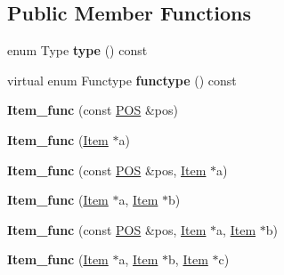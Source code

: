 \subsection*{Public Member Functions}
\begin{DoxyCompactItemize}
\item 
\mbox{\label{classItem__func_a62fceaba6fa966fada11ff11d12ad92f}} 
enum Type {\bfseries type} () const
\item 
\mbox{\label{classItem__func_a1e75d83f7d9d6d931c357d9c2d1f9981}} 
virtual enum Functype {\bfseries functype} () const
\item 
\mbox{\label{classItem__func_a22206aa34356f6eafea7e009a7a2696d}} 
{\bfseries Item\+\_\+func} (const \mbox{\hyperlink{structYYLTYPE}{P\+OS}} \&pos)
\item 
\mbox{\label{classItem__func_ada3fc37d59dcf0401cfd604ca7e9fb9c}} 
{\bfseries Item\+\_\+func} (\mbox{\hyperlink{classItem}{Item}} $\ast$a)
\item 
\mbox{\label{classItem__func_a3ae788a843114af1a60a21e0c087b8c0}} 
{\bfseries Item\+\_\+func} (const \mbox{\hyperlink{structYYLTYPE}{P\+OS}} \&pos, \mbox{\hyperlink{classItem}{Item}} $\ast$a)
\item 
\mbox{\label{classItem__func_a2a1f46e87b62b6c97ab1a7cedf6f1d89}} 
{\bfseries Item\+\_\+func} (\mbox{\hyperlink{classItem}{Item}} $\ast$a, \mbox{\hyperlink{classItem}{Item}} $\ast$b)
\item 
\mbox{\label{classItem__func_aa30c9b75780f60cfe6696bca39d4124d}} 
{\bfseries Item\+\_\+func} (const \mbox{\hyperlink{structYYLTYPE}{P\+OS}} \&pos, \mbox{\hyperlink{classItem}{Item}} $\ast$a, \mbox{\hyperlink{classItem}{Item}} $\ast$b)
\item 
\mbox{\label{classItem__func_afad7f11f6cf1c71aa1a2ec8cb271d72c}} 
{\bfseries Item\+\_\+func} (\mbox{\hyperlink{classItem}{Item}} $\ast$a, \mbox{\hyperlink{classItem}{Item}} $\ast$b, \mbox{\hyperlink{classItem}{Item}} $\ast$c)
\item 
\mbox{\label{classItem__func_a093e650aba3d7f81f2d751d9d1c811c2}} 

\end{DoxyCompactItemize}
